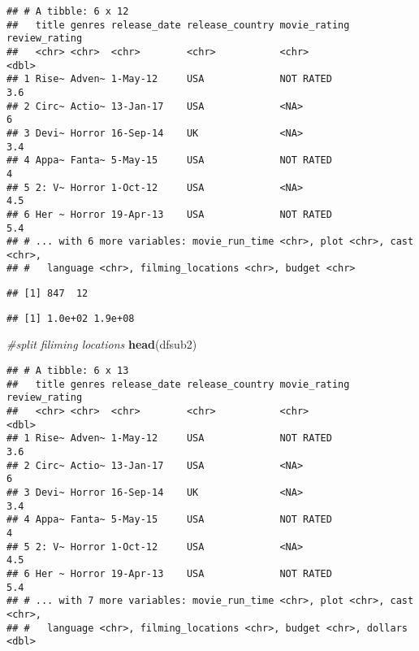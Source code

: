 \documentclass[]{article}
\newenvironment{Shaded}{\begin{snugshade}}{\end{snugshade}}
\newcommand{\KeywordTok}[1]{\textcolor[rgb]{0.13,0.29,0.53}{\textbf{#1}}}
\newcommand{\CharTok}[1]{\textcolor[rgb]{0.31,0.60,0.02}{#1}}
\newcommand{\StringTok}[1]{\textcolor[rgb]{0.31,0.60,0.02}{#1}}
\newcommand{\CommentTok}[1]{\textcolor[rgb]{0.56,0.35,0.01}{\textit{#1}}}
\newcommand{\OperatorTok}[1]{\textcolor[rgb]{0.81,0.36,0.00}{\textbf{#1}}}
\newcommand{\NormalTok}[1]{#1}
\begin{document}
\begin{verbatim}
## # A tibble: 6 x 12
##   title genres release_date release_country movie_rating review_rating
##   <chr> <chr>  <chr>        <chr>           <chr>                <dbl>
## 1 Rise~ Adven~ 1-May-12     USA             NOT RATED              3.6
## 2 Circ~ Actio~ 13-Jan-17    USA             <NA>                   6  
## 3 Devi~ Horror 16-Sep-14    UK              <NA>                   3.4
## 4 Appa~ Fanta~ 5-May-15     USA             NOT RATED              4  
## 5 2: V~ Horror 1-Oct-12     USA             <NA>                   4.5
## 6 Her ~ Horror 19-Apr-13    USA             NOT RATED              5.4
## # ... with 6 more variables: movie_run_time <chr>, plot <chr>, cast <chr>,
## #   language <chr>, filming_locations <chr>, budget <chr>
\end{verbatim}

\begin{verbatim}
## [1] 847  12
\end{verbatim}

\begin{Shaded}
\end{Shaded}

\begin{verbatim}
## [1] 1.0e+02 1.9e+08
\end{verbatim}

\begin{Shaded}
\begin{Highlighting}[]
\CommentTok{#split filiming locations }
\KeywordTok{head}\NormalTok{(dfsub2)}
\end{Highlighting}
\end{Shaded}

\begin{verbatim}
## # A tibble: 6 x 13
##   title genres release_date release_country movie_rating review_rating
##   <chr> <chr>  <chr>        <chr>           <chr>                <dbl>
## 1 Rise~ Adven~ 1-May-12     USA             NOT RATED              3.6
## 2 Circ~ Actio~ 13-Jan-17    USA             <NA>                   6  
## 3 Devi~ Horror 16-Sep-14    UK              <NA>                   3.4
## 4 Appa~ Fanta~ 5-May-15     USA             NOT RATED              4  
## 5 2: V~ Horror 1-Oct-12     USA             <NA>                   4.5
## 6 Her ~ Horror 19-Apr-13    USA             NOT RATED              5.4
## # ... with 7 more variables: movie_run_time <chr>, plot <chr>, cast <chr>,
## #   language <chr>, filming_locations <chr>, budget <chr>, dollars <dbl>
\end{verbatim}
\end{document}
